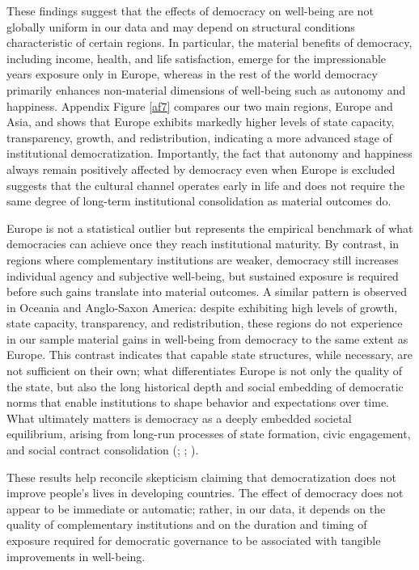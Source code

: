 \documentclass[11pt]{article}
\newcommand{\aaa}[1]{\cOne{#1}} %
\begin{document}
These findings suggest that the effects of democracy on well-being are not globally uniform in our data and may depend on structural conditions characteristic of certain regions. In particular, the material benefits of democracy, including income, health, and life satisfaction, emerge for the impressionable years exposure only in Europe, whereas in the rest of the world democracy primarily enhances non-material dimensions of well-being such as autonomy and happiness. Appendix Figure \ref{af7} compares our two main regions, Europe and Asia, and shows that Europe exhibits markedly higher levels of state capacity, transparency, growth, and redistribution, indicating a more advanced stage of institutional democratization. Importantly, the fact that autonomy and happiness always remain positively affected by democracy even when Europe is excluded suggests that the cultural channel operates early in life and does not require the same degree of long-term institutional consolidation as material outcomes do.

Europe is not a statistical outlier but represents the empirical benchmark of what democracies can achieve once they reach institutional maturity. By contrast, in regions where complementary institutions are weaker, democracy still increases individual agency and subjective well-being, but sustained exposure is required before such gains translate into material outcomes. A similar pattern is observed in Oceania and Anglo-Saxon America: despite exhibiting high levels of growth, state capacity, transparency, and redistribution, these regions do not experience in our sample material gains in well-being from democracy to the same extent as Europe. This contrast indicates that capable state structures, while necessary, are not sufficient on their own; what differentiates Europe is not only the quality of the state, but also the long historical depth and social embedding of democratic norms that enable institutions to shape behavior and expectations over time. What ultimately matters is democracy as a deeply embedded societal equilibrium, arising from long-run processes of state formation, civic engagement, and social contract consolidation (\aaa{North1990}; \aaa{Putnam1993}; \aaa{Acemoglu2012}).

These results help reconcile skepticism claiming that democratization does not improve people’s lives in developing countries. The effect of democracy does not appear to be immediate or automatic; rather, in our data, it depends on the quality of complementary institutions and on the duration and timing of exposure required for democratic governance to be associated with tangible improvements in well-being.
\end{document}
